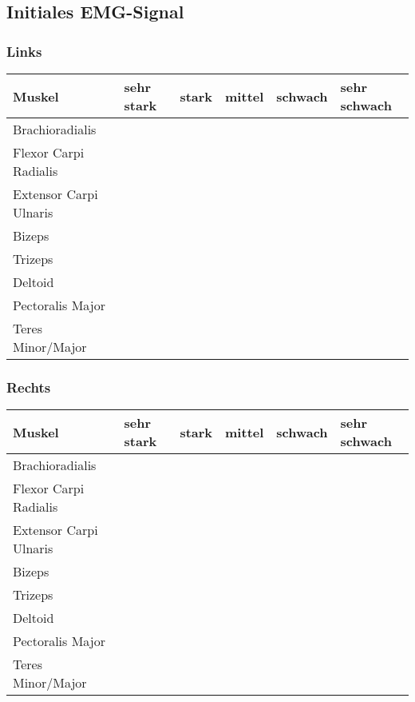 \documentclass{article}
\begin{document}
\subsection{Initiales EMG-Signal}
\subsubsection{Links}
\begin{center}
  \begin{tabular}{ |p{} |  p{} | p{} | p{} | p{} | p{} |  }
    \hline
    Muskel & sehr stark & stark & mittel & schwach & sehr schwach \\ \hline
    Brachioradialis  & & & & &\\ \hline
    Flexor Carpi Radialis  & & & & &\\ \hline
    Extensor Carpi Ulnaris  & & & & &\\ \hline
    Bizeps & & & & &\\ \hline
    Trizeps & & & & &\\ \hline
    Deltoid & & & & &\\ \hline
    Pectoralis Major & & & & &\\ \hline
    Teres Minor/Major & & & & &\\ \hline 
  \end{tabular}
\end{center}

\subsubsection{Rechts}
\begin{center}
  \begin{tabular}{ |p{} |  p{} | p{} | p{} | p{} | p{} |  }
    \hline
    Muskel & sehr stark & stark & mittel & schwach & sehr schwach \\ \hline
    Brachioradialis  & & & & &\\ \hline
    Flexor Carpi Radialis  & & & & &\\ \hline
    Extensor Carpi Ulnaris  & & & & &\\ \hline
    Bizeps & & & & &\\ \hline
    Trizeps & & & & &\\ \hline
    Deltoid & & & & &\\ \hline
    Pectoralis Major & & & & &\\ \hline
    Teres Minor/Major & & & & &\\ \hline 
  \end{tabular}
\end{center}
\end{document}
